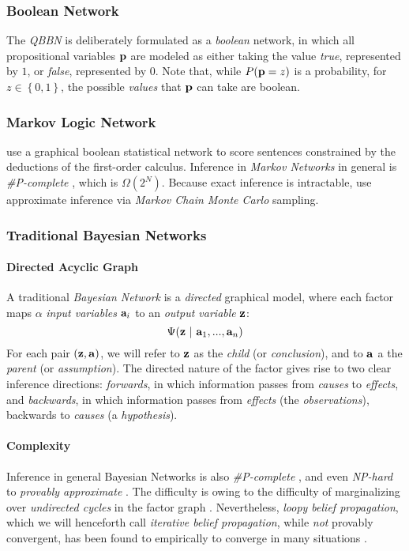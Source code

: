 \documentclass[11pt]{article}
\newcommand{\zvariable}{{\bf z}}
\newcommand{\avariable}{{\bf a}}
\newcommand{\pvariable}{{\bf p}}
\newcommand{\condsep}{\ |\ }
\begin{document}
\subsubsection*{Boolean Network}
The {\em QBBN} is deliberately formulated as a {\em boolean} network, in which all propositional variables $\pvariable$ are modeled as either taking the value {\em true}, represented by $1$, or {\em false}, represented by $0$.
Note that, while $P(\pvariable = z)$ is a probability, for $z \in \left\{0, 1\right\}$, the possible {\em values} that $\pvariable$ can take are boolean.

\subsubsection*{Markov Logic Network}
\cite{richardson2006markov} use a graphical boolean statistical network to score sentences constrained by the deductions of the first-order calculus.
Inference in {\em Markov Networks} in general is {\em \#P-complete} \cite{Roth1996HardnessApproxReasoning}, which is $\Omega(2^N)$.
Because exact inference is intractable, \cite{richardson2006markov} use approximate inference via {\em Markov Chain Monte Carlo} \cite{gilks1996markov} sampling.

\subsubsection*{Traditional Bayesian Networks}
\paragraph{Directed Acyclic Graph}
A traditional {\em Bayesian Network} is a {\em directed} graphical model, where each factor maps $\alpha$ {\em input variables} $\avariable_i$ to an {\em output variable} $\zvariable$:
\begin{equation} \Psi(\zvariable \condsep \avariable_1, ..., \avariable_n) \end{equation}
For each pair $(\zvariable, \avariable)$, we will refer to $\zvariable$ as the {\em child} (or {\em conclusion}), and to $\avariable$ a the {\em parent} (or {\em assumption}).
The directed nature of the factor gives rise to two clear inference directions: {\em forwards}, in which information passes from {\em causes} to {\em effects}, and {\em backwards}, in which information passes from {\em effects} (the {\em observations}), backwards to {\em causes} (a {\em hypothesis}).

\paragraph{Complexity}
Inference in general Bayesian Networks is also {\em \#P-complete} \cite{Cooper1990}, and even {\em NP-hard} to {\em provably approximate} \cite{Roth1996HardnessApproxReasoning}.
The difficulty is owing to the difficulty of marginalizing over {\em undirected cycles} in the factor graph \cite{neapolitan2003learning,koller2009probabilistic}.
Nevertheless, {\em loopy belief propagation}, which we will henceforth call {\em iterative belief propagation}, while {\em not} provably convergent, has been found to empirically to converge in many situations \cite{murphy1999loopy, Smith2008}.
\end{document}
